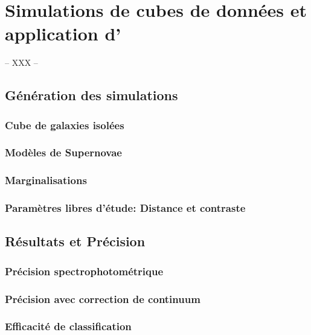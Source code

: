 \documentclass[../main/main.tex]{subfiles}
\begin{document}
\chapter{Simulations de cubes de données et application d'\hypergal}\label{ch:res}

-- XXX --

\minitoc
\newpage

\section{Génération des simulations}

\subsection{Cube de galaxies isolées}

\subsection{Modèles de Supernovae}

\subsection{Marginalisations}

\subsection{Paramètres libres d'étude: Distance et contraste}

\section{Résultats et Précision}

\subsection{Précision spectrophotométrique}

\subsection{Précision avec correction de continuum}

\subsection{Efficacité de classification}
\end{document}
